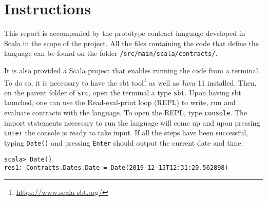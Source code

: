 \documentclass{ituthesis}
\begin{document}

\hyphenchar{}

\frontmatter

\thetitlepage
\newpage

\cleardoublepage
\setcounter{tocdepth}{1}
\tableofcontents

\mainmatter

\midsloppy
\sloppybottom

\chapter*{Instructions}

This report is accompanied by the prototype contract language developed in Scala in the scope of the project. All the files containing the code that define the language can be found on the folder \texttt{/src/main/scala/contracts/}.

It is also provided a Scala project that enables running the code from a terminal. To do so, it is necessary to have the sbt tool\footnote{\url{https://www.scala-sbt.org/}} as well as Java 11 installed. Then, on the parent folder of \texttt{src}, open the terminal a type \texttt{sbt}. Upon having sbt launched, one can use the Read-eval-print loop (REPL) to write, run and evaluate contracts with the language. To open the REPL, type \texttt{console}. The import statements necessary to run the language will come up and upon pressing \texttt{Enter} the console is ready to take input. If all the steps have been successful, typing \texttt{Date()} and pressing \texttt{Enter} should output the current date and time:
\begin{lstlisting}
scala> Date()
res1: Contracts.Dates.Date = Date(2019-12-15T12:31:20.562898)
\end{lstlisting}
\end{document}
